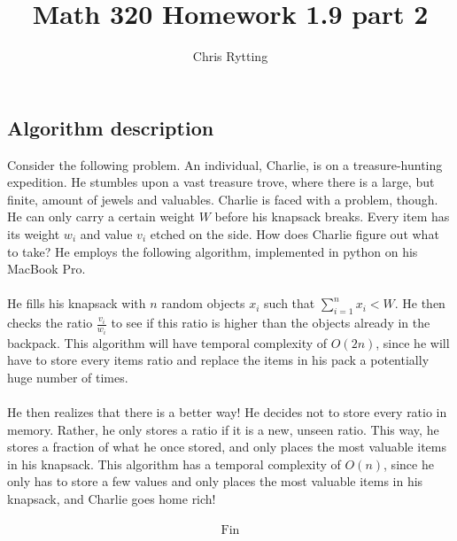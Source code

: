 \documentclass[letterpaper,12pt]{article}
\theoremstyle{definition}
\begin{document}
\title{Math 320 Homework 1.9 part 2}
\author{Chris Rytting}
\maketitle

\subsection*{Algorithm description}
Consider the following problem. An individual, Charlie, is on a treasure-hunting expedition. He stumbles upon a vast treasure trove, where there is a large, but finite, amount of jewels and valuables. Charlie is faced with a problem, though. He can only carry a certain weight $W$ before his knapsack breaks.
Every item has its weight $w_i$ and value $v_i$ etched on the side. How does Charlie figure out what to take?
He employs the following algorithm, implemented in python on his MacBook Pro. 
\\
\\
He fills his knapsack with $n$ random objects $x_i$ such that $ \sum^{n}_{i=1} x_i < W$. He then checks the ratio $\frac{v_i}{w_i}$ to see if this ratio is higher than the objects already in the backpack. This algorithm will have temporal complexity of $O(2n)$, since he will have to store every items ratio and replace the items in his pack a potentially huge number of times.
\\\\
He then realizes that there is a better way! He decides not to store every ratio in memory. Rather, he only stores a ratio if it is a new, unseen ratio. This way, he stores a fraction of what he once stored, and only places the most valuable items in his knapsack. This algorithm has a temporal complexity of $O(n)$, since he only has to store a few values and only places the most valuable items in his knapsack, and Charlie goes home rich!
\\\\ \[\text{Fin} \]
\end{document}

